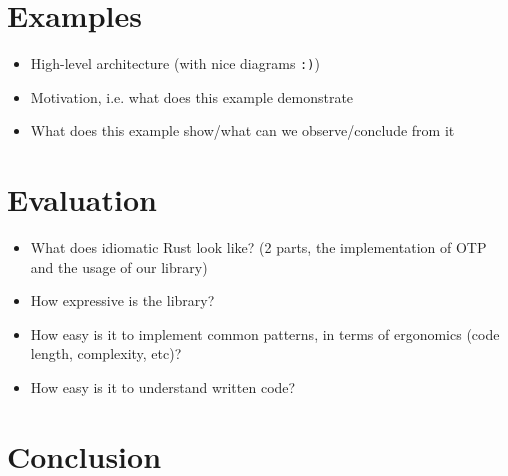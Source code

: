 \documentclass[a4paper]{article}
\begin{document}
\section{Examples}
\begin{itemize}
\item High-level architecture (with nice diagrams \texttt{:)})
\item Motivation, i.e. what does this example demonstrate
\item What does this example show/what can we observe/conclude from it
\end{itemize}

\section{Evaluation}
\begin{itemize}
\item What does idiomatic Rust look like? (2 parts, the implementation of OTP
  and the usage of our library)
\item How expressive is the library?
\item How easy is it to implement common patterns, in terms of ergonomics (code
  length, complexity, etc)?
\item How easy is it to understand written code?
\end{itemize}

\section{Conclusion}
\end{document}
